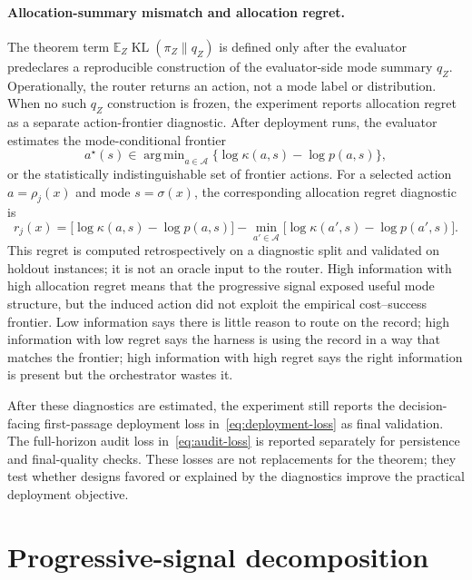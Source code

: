 \documentclass{article}
\DeclareMathOperator*{\argmin}{arg\,min}
\DeclareMathOperator{\KL}{KL}
\newcommand{\cA}{\mathcal{A}}
\newcommand{\E}{\mathbb{E}}
\begin{document}
\paragraph{Allocation-summary mismatch and allocation regret.}
The theorem term $\E_Z\KL(\pi_Z\|q_Z)$ is defined only after the evaluator predeclares a reproducible construction of the evaluator-side mode summary $q_Z$.
Operationally, the router returns an action, not a mode label or distribution.
When no such $q_Z$ construction is frozen, the experiment reports allocation regret as a separate action-frontier diagnostic.
After deployment runs, the evaluator estimates the mode-conditional frontier
\[
a^\star(s)\in\argmin_{a\in\cA}\{\log\kappa(a,s)-\log p(a,s)\},
\]
or the statistically indistinguishable set of frontier actions.
For a selected action $a=\rho_j(x)$ and mode $s=\sigma(x)$, the corresponding allocation regret diagnostic is
\[
r_j(x)
=
\bigl[\log\kappa(a,s)-\log p(a,s)\bigr]
-
\min_{a'\in\cA}\bigl[\log\kappa(a',s)-\log p(a',s)\bigr].
\]
This regret is computed retrospectively on a diagnostic split and validated on holdout instances; it is not an oracle input to the router.
High information with high allocation regret means that the progressive signal exposed useful mode structure, but the induced action did not exploit the empirical cost--success frontier.
Low information says there is little reason to route on the record; high information with low regret says the harness is using the record in a way that matches the frontier; high information with high regret says the right information is present but the orchestrator wastes it.

After these diagnostics are estimated, the experiment still reports the decision-facing first-passage deployment loss in~\eqref{eq:deployment-loss} as final validation.
The full-horizon audit loss in~\eqref{eq:audit-loss} is reported separately for persistence and final-quality checks.
These losses are not replacements for the theorem; they test whether designs favored or explained by the diagnostics improve the practical deployment objective.

\section{Progressive-signal decomposition}
\label{app:operational-decomp}
\end{document}
